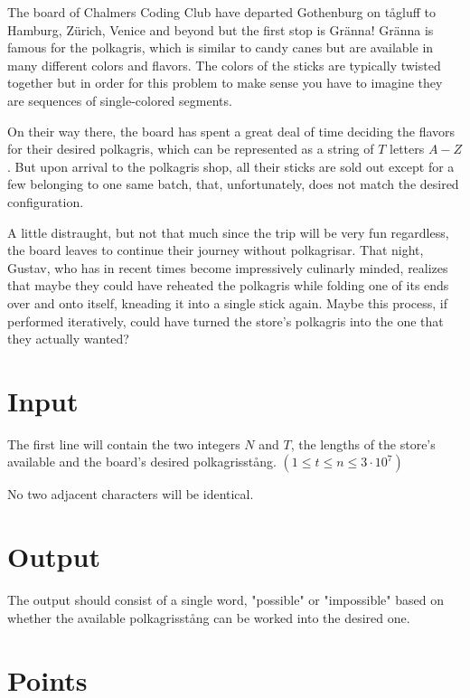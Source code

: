 \noindent

The board of Chalmers Coding Club have departed Gothenburg on tågluff to Hamburg, Zürich, Venice and
beyond but the first stop is Gränna! Gränna is famous for the polkagris, which is similar to candy
canes but are available in many different colors and flavors. The colors of the sticks are typically
twisted together but in order for this problem to make sense you have to imagine they are sequences
of single-colored segments.

On their way there, the board has spent a great deal of time deciding the flavors for their desired
polkagris, which can be represented as a string of $T$ letters $A-Z$. But upon arrival to the
polkagris shop, all their sticks are sold out except for a few belonging to one same batch, that,
unfortunately, does not match the desired configuration.

A little distraught, but not that much since the trip will be very fun regardless, the board leaves
to continue their journey without polkagrisar. That night, Gustav, who has in recent times become
impressively culinarly minded, realizes that maybe they could have reheated the polkagris while
folding one of its ends over and onto itself, kneading it into a single stick again. Maybe this
process, if performed iteratively, could have turned the store's polkagris into the one that they
actually wanted?

\section*{Input}

The first line will contain the two integers $N$ and $T$, the lengths of the store's available and
the board's desired polkagrisstång. $(1 \leq t \leq n \leq 3 \cdot 10^7)$

No two adjacent characters will be identical.

\section*{Output}

The output should consist of a single word, "possible" or "impossible" based on whether the
available polkagrisstång can be worked into the desired one.

\section*{Points}

